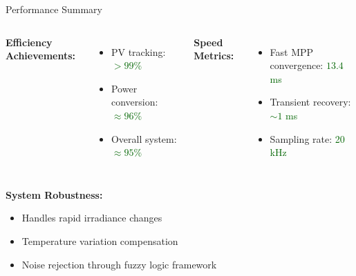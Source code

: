 \documentclass[aspectratio=169,usenames,dvipsnames]{beamer}
\begin{document}
\begin{frame}{Performance Summary}
    \begin{columns}
        \textbf{Efficiency Achievements:}
        \begin{itemize}
            \item PV tracking: \textcolor{darkgreen}{$> 99\%$}
            \item Power conversion: \textcolor{darkgreen}{$\approx 96\%$}
            \item Overall system: \textcolor{darkgreen}{$\approx 95\%$}
        \end{itemize}
        
        \textbf{Speed Metrics:}
        \begin{itemize}
            \item Fast MPP convergence: \textcolor{darkgreen}{$13.4$ ms}
            \item Transient recovery: \textcolor{darkgreen}{$\sim 1$ ms}
            \item Sampling rate: \textcolor{darkgreen}{20 kHz}
        \end{itemize}
    \end{columns}
    
    \vspace{0.3cm}
    \textbf{System Robustness:}
    \begin{itemize}
        \item Handles rapid irradiance changes
        \item Temperature variation compensation
        \item Noise rejection through fuzzy logic framework
    \end{itemize}
\end{frame}
\end{document}
